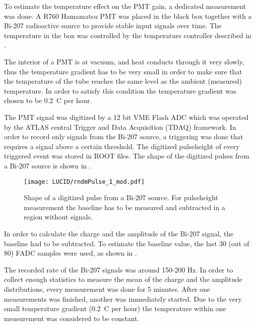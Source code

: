 To estimate the temperature effect on the PMT gain, a dedicated measurement was done. 
A R760 Hamamatsu PMT was placed in the black box together with a Bi-207 radioactive source
to provide stable input signals over time. The temperature in the box was controlled by the temperature controller described in 
.

The interior of a PMT is at vacuum, and heat conducts through it very slowly, thus the temperature gradient has to be very small in order to make sure 
that the temperature of the tube reaches the same level as the ambient (measured) temperature.
In order to satisfy this condition the temperature gradient was chosen to be 0.2\degree~C per hour.

The PMT signal was digitized by a 12 bit VME Flash ADC which was operated by the ATLAS central Trigger and Data Acquisition (TDAQ) framework.
In order to record only signals from the Bi-207 source, a triggering was done that requires a signal above a certain threshold.
The digitized pulseheight of every triggered event was stored in ROOT files.
The shape of the digitized pulses from a Bi-207 source is shown in . 

\begin{figure}
\centering
\texttt{[image: LUCID/rndmPulse\_1\_mod.pdf]}
\caption{Shape of a digitized pulse from a Bi-207 source. For pulseheight measurement the baseline has to be measured and subtracted in a region without signals.}
\label{fig:bi207DigitizedPulse}
\end{figure}

In order to calculate the charge and the amplitude of the Bi-207 signal, the baseline had to be subtracted. 
To estimate the baseline value, the last 30 (out of 80) FADC samples were used, as shown in .

The recorded rate of the Bi-207 signals was around 150-200 Hz. In order to collect enough statistics to measure the mean of the charge and 
the amplitude distributions, every measurement was done for 5 minutes. 
After one measurements was finished, another was immediately started.
Due to the very small temperature gradient (0.2\degree~C per hour) the temperature within one measurement was considered to be constant.

